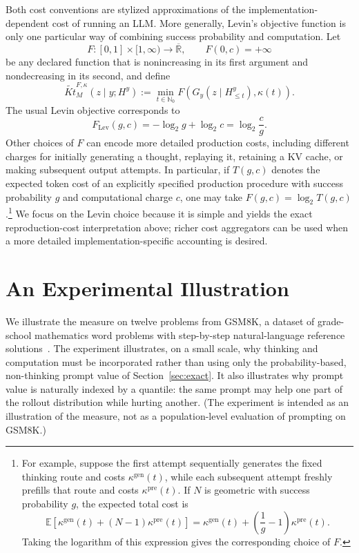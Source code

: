 \documentclass[letterpaper]{article} %
\theoremstyle{definition}
\theoremstyle{remark}
\newcommand{\E}{\mathbb{E}}
\begin{document}
Both cost conventions are stylized approximations of the
implementation-dependent cost of running an LLM. More generally, Levin's
objective function is only one particular way of combining success probability and
computation. Let
\[
  F:[0,1]\times[1,\infty)\longrightarrow\overline{\mathbb R},
  \qquad F(0,c)=+\infty
\]
be any declared function that is nonincreasing in its first argument and
nondecreasing in its second, and define
\[
  \widetilde{Kt}^{F,\kappa}_M(z\mid y;H^y)
  :=
  \min_{t\in\mathbb N_0}
  F\!\left(
    G_y(z\mid H^y_{\leq t}),
    \kappa(t)
  \right).
\]
The usual Levin objective corresponds to
\[
  F_{\mathrm{Lev}}(g,c)
  =
  -\log_2 g+\log_2 c
  =
  \log_2\frac{c}{g}.
\]
Other choices of \(F\) can encode more detailed production costs, including
different charges for initially generating a thought, replaying it, retaining
a KV cache, or making subsequent output attempts. In particular, if
\(T(g,c)\) denotes the expected token cost of an explicitly specified
production procedure with success probability \(g\) and computational charge
\(c\), one may take \(F(g,c)=\log_2T(g,c)\).\footnote{For example, suppose the
first attempt sequentially generates the fixed thinking route and costs
\(\kappa^{\mathrm{gen}}(t)\), while each subsequent attempt freshly prefills
that route and costs \(\kappa^{\mathrm{pre}}(t)\). If \(N\) is geometric with
success probability \(g\), the expected total cost is
\[
\E\!\left[
\kappa^{\mathrm{gen}}(t)+(N-1)\kappa^{\mathrm{pre}}(t)
\right]
=
\kappa^{\mathrm{gen}}(t)
+\left(\frac1g-1\right)\kappa^{\mathrm{pre}}(t).
\]
Taking the logarithm of this expression gives the corresponding choice of
\(F\).}
We focus on the Levin choice
because it is simple and yields the exact reproduction-cost
interpretation above; richer cost aggregators can be used when a more detailed implementation-specific accounting is desired.


\section{An Experimental Illustration}\label{sec:experiment}

We illustrate the measure on twelve problems from GSM8K, a dataset of
grade-school mathematics word problems with step-by-step natural-language
reference solutions~\cite{GSM8K}.
The experiment illustrates, on
a small scale, why thinking and computation must be incorporated rather than
using only the probability-based, non-thinking prompt value of
Section~\ref{sec:exact}. It also illustrates why prompt value is naturally
indexed by a quantile: the same prompt may help one part of the rollout
distribution while hurting another. 
(The experiment is intended as an
illustration of the measure, not as a population-level evaluation of prompting
on GSM8K.)
\end{document}
